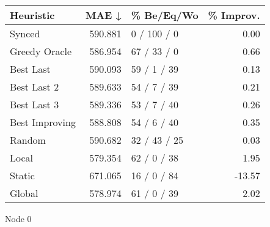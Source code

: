 \begin{tabular}{lrlr}
\toprule
\textbf{Heuristic} & \textbf{MAE ↓} & \textbf{\% Be/Eq/Wo} & \textbf{\% Improv.} \\
\midrule
            Synced &        590.881 &          0 / 100 / 0 &                0.00 \\
     Greedy Oracle &        586.954 &          67 / 33 / 0 &                0.66 \\
         Best Last &        590.093 &          59 / 1 / 39 &                0.13 \\
       Best Last 2 &        589.633 &          54 / 7 / 39 &                0.21 \\
       Best Last 3 &        589.336 &          53 / 7 / 40 &                0.26 \\
    Best Improving &        588.808 &          54 / 6 / 40 &                0.35 \\
            Random &        590.682 &         32 / 43 / 25 &                0.03 \\
             Local &        579.354 &          62 / 0 / 38 &                1.95 \\
            Static &        671.065 &          16 / 0 / 84 &              -13.57 \\
            Global &        578.974 &          61 / 0 / 39 &                2.02 \\
\bottomrule
\end{tabular}
\caption{Node 0}
\label{tab:iid_lr05_le1_bs4_0}
